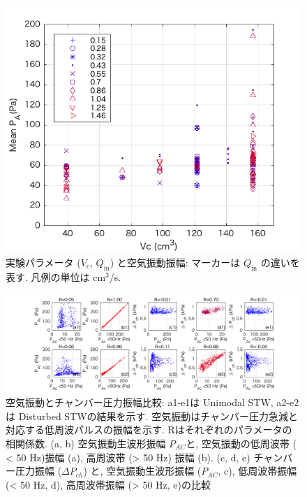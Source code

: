 \documentclass[12pt]{article}
\begin{document}
\begin{figure}[H]
\begin{center}
\includegraphics[scale=1] {QVA.png} 
\caption[実験パラメータと空気振動振幅]
{実験パラメータ ($V_\mathrm{c}$, $Q_\mathrm{in}$) と空気振動振幅: マーカーは $Q_\mathrm{in}$ の違いを表す. 凡例の単位は cm$^3$/s.}
\label{QVA}
\end{center}
\end{figure} 






\begin{landscape}
\begin{figure}[H]
\begin{center}
\includegraphics[scale=1] {PAPCall.png} 
\caption[空気振動とチャンバー圧力振幅比較]
{空気振動とチャンバー圧力振幅比較: a1-e1は Unimodal STW, a2-e2は Disturbed STWの結果を示す. 空気振動はチャンバー圧力急減と対応する低周波パルスの振幅を示す. Rはそれぞれのパラメータの相関係数. (a, b) 空気振動生波形振幅 $P_{AC}$と, 空気振動の低周波帯 ( < 50 Hz)振幅 (a), 高周波帯 (> 50 Hz) 振幅 (b). (c, d, e) チャンバー圧力振幅 ($\Delta P_{ch}$) と, 空気振動生波形振幅 ($P_{AC}$, c), 低周波帯振幅 (< 50 Hz, d), 高周波帯振幅 (> 50 Hz, e)の比較}
\label{PAPCall}
\end{center}
\end{figure} 
\end{landscape}
\end{document}
